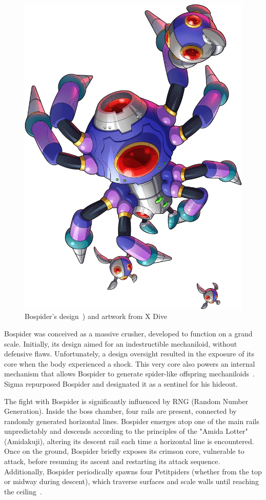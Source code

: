 \begin{figure}[htp]
	\includegraphics[height=\portraitsize]{figures/X1/Sigma_stages/Bospider.png}
	\caption{Bospider's design~\cite{book:MMX_Complete_art}) and artwork from X Dive}
\end{figure}
Bospider was conceived as a massive crusher, developed to function on a grand scale. Initially, its design aimed for an indestructible mechaniloid, without defensive flaws. Unfortunately, a design oversight resulted in the exposure of its core when the body experienced a shock. This very core also powers an internal mechanism that allows Bospider to generate spider-like offspring mechaniloids~\cite{wayback:X_resources}. Sigma repurposed Bospider and designated it as a sentinel for his hideout.

The fight with Bospider is significantly influenced by RNG (Random Number Generation). Inside the boss chamber, four rails are present, connected by randomly generated horizontal lines. Bospider emerges atop one of the main rails unpredictably and descends according to the principles of the "Amida Lotter" (Amidakuji), altering its descent rail each time a horizontal line is encountered. Once on the ground, Bospider briefly exposes its crimson core, vulnerable to attack, before resuming its ascent and restarting its attack sequence. Additionally, Bospider periodically spawns four Petitpiders (whether from the top or midway during descent), which traverse surfaces and scale walls until reaching the ceiling~\cite{wiki:Bospider}.

